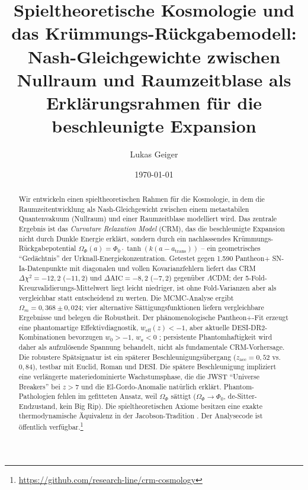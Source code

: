 \documentclass[aps,prd,twocolumn,superscriptaddress,nofootinbib]{revtex4-2}
\begin{document}

\title{Spieltheoretische Kosmologie und das Kr\"ummungs-R\"uckgabemodell: Nash-Gleichgewichte zwischen Nullraum und Raumzeitblase als Erkl\"arungsrahmen f\"ur die beschleunigte Expansion}

\author{Lukas Geiger}

\date{\today}


\begin{abstract}
Wir entwickeln einen spieltheoretischen Rahmen für die Kosmologie, in dem die Raumzeitentwicklung als Nash-Gleichgewicht zwischen einem metastabilen Quantenvakuum (Nullraum) und einer Raumzeitblase modelliert wird. Das zentrale Ergebnis ist das \textit{Curvature Relaxation Model} (CRM), das die beschleunigte Expansion nicht durch Dunkle Energie erklärt, sondern durch ein nachlassendes Krümmungs-Rückgabepotential $\Omega_\Phi(a) = \Phi_0 \cdot \tanh(k(a - a_{\mathrm{trans}}))$ -- ein geometrisches ``Gedächtnis'' der Urknall-Energiekonzentration. Getestet gegen 1.590 Pantheon+ SN-Ia-Datenpunkte \cite{Scolnic2022} mit diagonalen und vollen Kovarianzfehlern liefert das CRM $\Delta\chi^2 = -12{,}2$ ($-11{,}2$) und $\Delta\mathrm{AIC} = -8{,}2$ ($-7{,}2$) gegenüber $\Lambda$CDM; der 5-Fold-Kreuzvalidierungs-Mittelwert liegt leicht niedriger, ist ohne Fold-Varianzen aber als vergleichbar statt entscheidend zu werten. Die MCMC-Analyse ergibt $\Omega_m = 0{,}368 \pm 0{,}024$; vier alternative Sättigungsfunktionen liefern vergleichbare Ergebnisse und belegen die Robustheit. Der phänomenologische Pantheon+-Fit erzeugt eine phantomartige Effektivdiagnostik, $w_{\mathrm{eff}}(z)<-1$, aber aktuelle DESI-DR2-Kombinationen bevorzugen $w_0>-1$, $w_a<0$ \cite{DESI2025}; persistente Phantomhaftigkeit wird daher als aufzulösende Spannung behandelt, nicht als fundamentale CRM-Vorhersage. Die robustere Spätsignatur ist ein späterer Beschleunigungsübergang ($z_{\mathrm{acc}} = 0{,}52$ vs.\ $0{,}84$), testbar mit Euclid, Roman und DESI. Die spätere Beschleunigung impliziert eine verlängerte materiedominierte Wachstumsphase, die die JWST ``Universe Breakers'' bei $z > 7$ \cite{Labbe2023} und die El-Gordo-Anomalie \cite{Asencio2023} natürlich erklärt. Phantom-Pathologien fehlen im gefitteten Ansatz, weil $\Omega_\Phi$ sättigt ($\Omega_\Phi \to \Phi_0$, de-Sitter-Endzustand, kein Big Rip). Die spieltheoretischen Axiome besitzen eine exakte thermodynamische Äquivalenz in der Jacobson-Tradition \cite{Jacobson1995}. Der Analysecode ist öffentlich verfügbar.\footnote{\url{https://github.com/research-line/crm-cosmology}}

\end{abstract}
\end{document}
